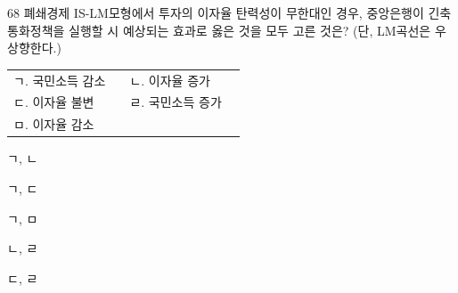 \begin{question}{68}
폐쇄경제 IS-LM모형에서 투자의 이자율 탄력성이 무한대인 경우, 중앙은행이 긴축통화정책을 실행할 시 예상되는 효과로 옳은 것을 모두 고른 것은? (단, LM곡선은 우상향한다.)
\begin{framedtext}
\begin{tabular}{@{}p{0.45\linewidth}p{0.45\linewidth}@{}}
ㄱ. 국민소득 감소 & ㄴ. 이자율 증가 \\
ㄷ. 이자율 불변 & ㄹ. 국민소득 증가 \\
ㅁ. 이자율 감소 & \\
\end{tabular}
\end{framedtext}
\begin{choices}
  \item ㄱ, ㄴ
  \item ㄱ, ㄷ
  \item ㄱ, ㅁ
  \item ㄴ, ㄹ
  \item ㄷ, ㄹ
\end{choices}
\end{question}
